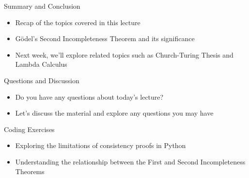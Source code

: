 \documentclass[presentation]{beamer}
\begin{document}
\begin{frame}[label={sec:org8356195}]{Summary and Conclusion}
\begin{itemize}
\item Recap of the topics covered in this lecture
\item Gödel's Second Incompleteness Theorem and its significance
\item Next week, we'll explore related topics such as Church-Turing Thesis and Lambda Calculus
\end{itemize}
\end{frame}

\begin{frame}[label={sec:orgfadd2e7}]{Questions and Discussion}
\begin{itemize}
\item Do you have any questions about today's lecture?
\item Let's discuss the material and explore any questions you may have
\end{itemize}
\end{frame}

\begin{frame}[label={sec:org9aeae45}]{Coding Exercises}
\begin{itemize}
\item Exploring the limitations of consistency proofs in Python
\item Understanding the relationship between the First and Second Incompleteness Theorems
\end{itemize}
\end{frame}
\end{document}

